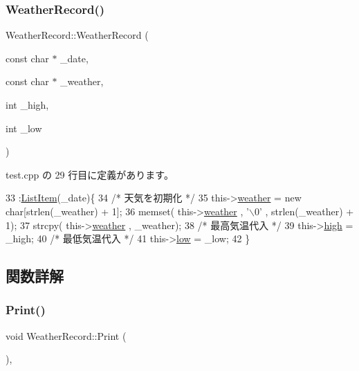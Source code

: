 \subsubsection{\texorpdfstring{Weather\+Record()}{WeatherRecord()}}
{\footnotesize\ttfamily Weather\+Record\+::\+Weather\+Record (\begin{DoxyParamCaption}\item[{const char $\ast$}]{\+\_\+date,  }\item[{const char $\ast$}]{\+\_\+weather,  }\item[{int}]{\+\_\+high,  }\item[{int}]{\+\_\+low }\end{DoxyParamCaption})\hspace{0.3cm}{\ttfamily [inline]}}



 test.\+cpp の 29 行目に定義があります。


\begin{DoxyCode}
33              :\hyperlink{class_list_item_a19fe16421201217d9c0647865243c07b}{ListItem}(\_date)\{
34         \textcolor{comment}{/* 天気を初期化 */}
35         this->\hyperlink{class_weather_record_a3b9b2139f84c02e1ba36b1bee333e057}{weather} = \textcolor{keyword}{new} \textcolor{keywordtype}{char}[strlen(\_weather) + 1];
36         memset( this->\hyperlink{class_weather_record_a3b9b2139f84c02e1ba36b1bee333e057}{weather} , \textcolor{charliteral}{'\(\backslash\)0'} , strlen(\_weather) + 1);
37         strcpy( this->\hyperlink{class_weather_record_a3b9b2139f84c02e1ba36b1bee333e057}{weather} , \_weather);
38         \textcolor{comment}{/* 最高気温代入 */}
39         this->\hyperlink{class_weather_record_ab1f968211ccc7fe600f76d31f3b0edc9}{high} = \_high;
40         \textcolor{comment}{/* 最低気温代入 */}
41         this->\hyperlink{class_weather_record_a16a7592e80388a4b2091c027cd18aed3}{low} = \_low;
42     \}
\end{DoxyCode}


\subsection{関数詳解}
\mbox{\label{class_weather_record_a824790f08728d4deb81dfcbaec5a76ba}} 
\subsubsection{\texorpdfstring{Print()}{Print()}}
{\footnotesize\ttfamily void Weather\+Record\+::\+Print (\begin{DoxyParamCaption}{ }\end{DoxyParamCaption})\hspace{0.3cm}{\ttfamily [inline]}, {\ttfamily [virtual]}}



